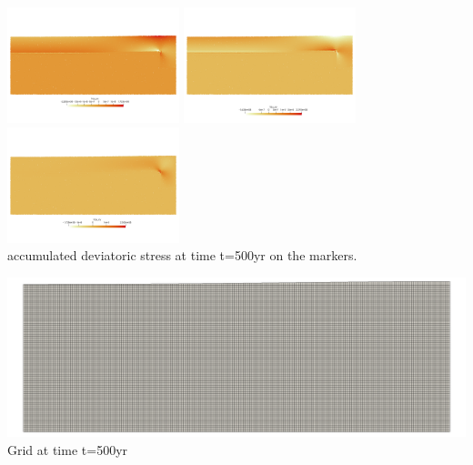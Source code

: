 \begin{center}
\includegraphics[width=5cm]{python_codes/fieldstone_64/results/flexureplate/tauxx}
\includegraphics[width=5cm]{python_codes/fieldstone_64/results/flexureplate/tauyy}
\includegraphics[width=5cm]{python_codes/fieldstone_64/results/flexureplate/tauxy}\\
{\captionfont accumulated deviatoric stress at time t=500yr on the markers.}
\end{center}


\begin{center}
\includegraphics[width=16cm]{python_codes/fieldstone_64/results/flexureplate/grid}\\
{\captionfont Grid at time t=500yr}
\end{center}





